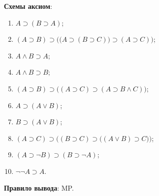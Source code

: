 \textbf{Схемы аксиом}:
\begin{enumerate}[label=(А\arabic*)]
    \item $A \supset (B \supset A)$;
    \item $(A \supset B) \supset \Big(\big(A \supset (B \supset C)\big) \supset (A \supset C)\Big)$;
    \item $A \land B \supset A$;
    \item $A \land B \supset B$;
    \item $(A \supset B) \supset \big((A \supset C) \supset (A \supset B \land C)\big)$;
    \item $A \supset (A \lor B)$;
    \item $B \supset (A \lor B)$;
    \item $(A \supset C) \supset \Big((B \supset C) \supset \big((A \lor B) \supset C\big)\Big)$;
    \item $(A \supset \neg B) \supset (B \supset \neg A)$;
    \item $\neg\neg A \supset A$.
\end{enumerate}

\textbf{Правило вывода}: MP.